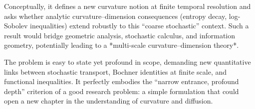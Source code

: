 Conceptually, it defines a new curvature notion at finite temporal resolution and asks whether analytic curvature–dimension consequences (entropy decay, log-Sobolev inequalities) extend robustly to this “coarse stochastic” context.  
Such a result would bridge geometric analysis, stochastic calculus, and information geometry, potentially leading to a *multi-scale curvature–dimension theory*.  

The problem is easy to state yet profound in scope, demanding new quantitative links between stochastic transport, Bochner identities at finite scale, and functional inequalities.  
It perfectly embodies the “narrow entrance, profound depth” criterion of a good research problem: a simple formulation that could open a new chapter in the understanding of curvature and diffusion.